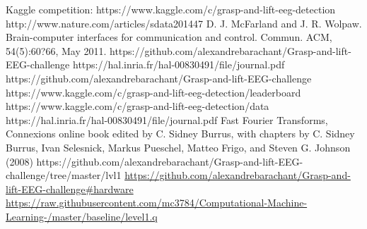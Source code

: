 \documentclass[final,leqno,onefignum,onetabnum]{siamltexmm}
\begin{document}
\begin{thebibliography}{1}
   Kaggle competition:  https://www.kaggle.com/c/grasp-and-lift-eeg-detection
   http://www.nature.com/articles/sdata201447
  D. J. McFarland and J. R. Wolpaw. Brain-computer interfaces for communication and control. Commun. ACM, 54(5):60?66, May 2011.
  https://github.com/alexandrebarachant/Grasp-and-lift-EEG-challenge
  https://hal.inria.fr/hal-00830491/file/journal.pdf
  https://github.com/alexandrebarachant/Grasp-and-lift-EEG-challenge
  https://www.kaggle.com/c/grasp-and-lift-eeg-detection/leaderboard
  https://www.kaggle.com/c/grasp-and-lift-eeg-detection/data
  https://hal.inria.fr/hal-00830491/file/journal.pdf
  Fast Fourier Transforms, Connexions online book edited by C. Sidney Burrus, with chapters by C. Sidney Burrus, Ivan Selesnick, Markus Pueschel, Matteo Frigo, and Steven G. Johnson (2008)
   https://github.com/alexandrebarachant/Grasp-and-lift-EEG-challenge/tree/master/lvl1
   \url{https://github.com/alexandrebarachant/Grasp-and-lift-EEG-challenge\#hardware}
   \url{https://raw.githubusercontent.com/mc3784/Computational-Machine-Learning-/master/baseline/level1.q}
\end{thebibliography} 
\end{document}
